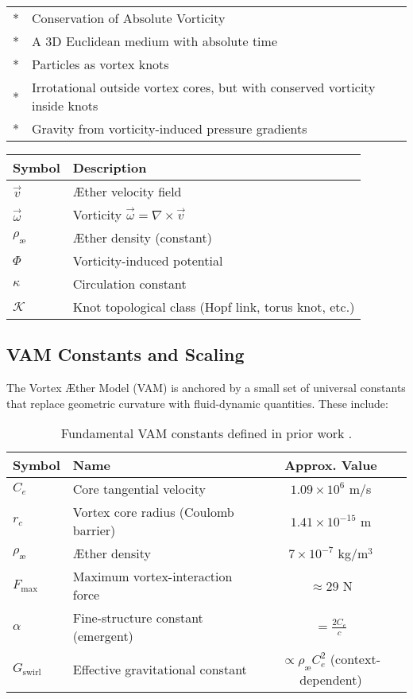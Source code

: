 \documentclass[aps,preprint,superscriptaddress]{revtex4}
\begin{document}
\begin{tabular}{ll}
    \toprule
    \midrule
        * & Conservation of Absolute Vorticity \\
        * & A 3D Euclidean medium with absolute time \\
        * & Particles as vortex knots \\
        * & Irrotational outside vortex cores, but with conserved vorticity inside knots \\
        * & Gravity from vorticity-induced pressure gradients \\
    \bottomrule
\end{tabular}


    \begin{tabular}{ll}
        \toprule
        Symbol & Description \\
        \midrule
        \(\vec{v}\) & Æther velocity field \\
        \(\vec{\omega}\) &  Vorticity \(\vec{\omega} = \nabla \times \vec{v}\) \\
        \(\rho_\text{æ}\) & Æther density (constant) \\
        \(\Phi\) & Vorticity-induced potential \\
        \(\kappa\) & Circulation constant \\
        \(\mathcal{K}\) & Knot topological class (Hopf link, torus knot, etc.) \\
        \bottomrule
    \end{tabular}

\subsection*{VAM Constants and Scaling}

The Vortex Æther Model (VAM) is anchored by a small set of universal constants that replace geometric curvature with fluid-dynamic quantities. These include:

\begin{table}[h!]
    \centering
    \begin{tabular}{llc}
        \hline
        \textbf{Symbol} & \textbf{Name} & \textbf{Approx. Value} \\
        \hline
        $C_e$ & Core tangential velocity & $1.09 \times 10^6$ m/s \\
        $r_c$ & Vortex core radius (Coulomb barrier) & $1.41 \times 10^{-15}$ m \\
        $\rho_{\text{\ae}}$ & Æther density & $7 \times 10^{-7}$ kg/m$^3$ \\
        $F_{\text{max}}$ & Maximum vortex-interaction force & $\approx 29$ N \\
        $\alpha$ & Fine-structure constant (emergent) & $= \frac{2 C_e}{c}$ \\
        $G_{\text{swirl}}$ & Effective gravitational constant & $ \propto \rho_{\text{\ae}} C_e^2$ (context-dependent) \\
        \hline
    \end{tabular}
    \caption{Fundamental VAM constants defined in prior work \cite{vam2025field, vam2025unified}.}
\end{table}
\end{document}
